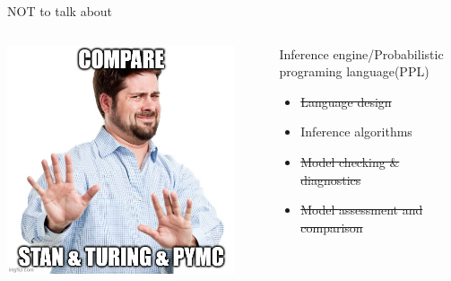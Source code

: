 \documentclass[bigger]{beamer}
\begin{document}
\begin{frame}[label={sec:org01490dc}]{NOT to talk about}
\begin{columns}
\begin{column}{0.33\columnwidth}
\begin{center}
\includegraphics[width=0.9\textwidth]{./figure/dont_want_3.jpg}
\end{center}
\end{column}

\begin{column}{0.33\columnwidth}
Inference engine/Probabilistic programing language(PPL)
\begin{itemize}
\item \sout{Language design}
\item Inference algorithms
\item \sout{Model checking \& diagnostics}
\item \sout{Model assessment and comparison}
\end{itemize}
\end{column}
\end{columns}
\end{frame}
\end{document}
